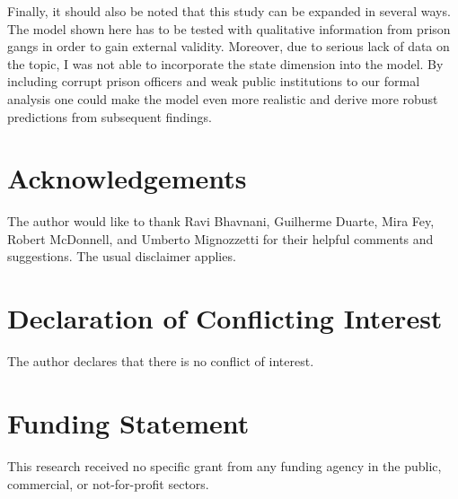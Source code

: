 \documentclass[a4paper,12pt]{article}
\begin{document}
Finally, it should also be noted that this study can be expanded in several ways. The model shown here  has to be tested with qualitative information from prison gangs in order to gain external validity. Moreover, due to serious lack of data on the topic, I was not able to incorporate the state dimension into the model. By including corrupt prison officers and weak public institutions to our formal analysis one could make the model even more realistic and derive more robust predictions from subsequent findings. 

\section*{Acknowledgements}
The author would like to thank Ravi Bhavnani, Guilherme Duarte, Mira Fey, Robert McDonnell, and Umberto Mignozzetti for their helpful comments and suggestions. The usual disclaimer applies.

\section*{Declaration of Conflicting Interest}
The author declares that there is no conflict of interest.

\section*{Funding Statement}
This research received no specific grant from any funding agency in the public, commercial, or not-for-profit sectors.

\theendnotes



\end{document}
